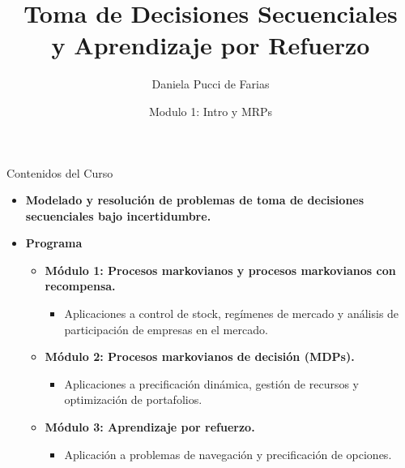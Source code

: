 \documentclass[xcolor=dvipsnames]{beamer}
\title{Toma de Decisiones Secuenciales \\ y Aprendizaje por Refuerzo}
\author{Daniela Pucci de Farias}
\institute{Universidad Torcuato Di Tella}
\date{Modulo 1: Intro y MRPs}
\begin{document}
\frame{\titlepage}

\begin{frame}{Contenidos del Curso}
\begin{itemize}
\item \textbf{Modelado y resolución de problemas de toma de decisiones secuenciales bajo incertidumbre.}
\item<2->  \textbf{Programa}
\begin{itemize}
\item<2->  \textbf{M\'odulo 1: Procesos markovianos y procesos markovianos con recompensa.}
\begin{itemize}
\item Aplicaciones a control de stock, regímenes de mercado y análisis de participación de empresas en el mercado.
\end{itemize}

\item<3-> \textbf{M\'odulo 2: Procesos markovianos de decisión (MDPs).}  
\begin{itemize}
\item Aplicaciones a precificación dinámica, gesti\'on de recursos y optimización de portafolios. 
\end{itemize}

\item<4->  \textbf{M\'odulo 3: Aprendizaje por refuerzo.} 
\begin{itemize}
\item Aplicación a problemas de navegación y precificación de opciones.
\end{itemize}
\end{itemize}
\end{itemize}   
\end{frame}
\end{document}
